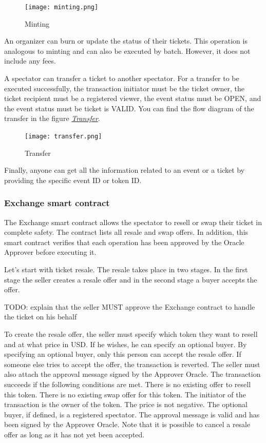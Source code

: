 \documentclass[a4paper,11pt,oneside]{report}
\begin{document}
\begin{figure}[h!]
  \texttt{[image: minting.png]}
  \caption{Minting}
  \label{fig:minting}
\end{figure}

An organizer can burn or update the status of their tickets. This operation is analogous to minting and can also be executed by batch. However, it does not include any fees.

A spectator can transfer a ticket to another spectator. For a transfer to be executed successfully, the transaction initiator must be the ticket owner, the ticket recipient must be a registered viewer, the event status must be OPEN, and the event status must be ticket is VALID. You can find the flow diagram of the transfer in the figure \hyperref[fig:transfer]{ \textit{Transfer}}.

\begin{figure}[h!]
  \centering
  \texttt{[image: transfer.png]}
  \caption{Transfer}
  \label{fig:transfer}
\end{figure}

Finally, anyone can get all the information related to an event or a ticket by providing the specific event ID or token ID.

\subsubsection{Exchange smart contract}
The Exchange smart contract allows the spectator to resell or swap their ticket in complete safety. The contract lists all resale and swap offers. In addition, this smart contract verifies that each operation has been approved by the Oracle Approver before executing it.

Let's start with ticket resale. The resale takes place in two stages. In the first stage the seller creates a resale offer and in the second stage a buyer accepts the offer.

TODO: explain that the seller MUST approve the Exchange contract to handle the ticket on his behalf

To create the resale offer, the seller must specify which token they want to resell and at what price in USD. If he wishes, he can specify an optional buyer. By specifying an optional buyer, only this person can accept the resale offer. If someone else tries to accept the offer, the transaction is reverted. The seller must also attach the approval message signed by the Approver Oracle. The transaction succeeds if the following conditions are met. There is no existing offer to resell this token. There is no existing swap offer for this token. The initiator of the transaction is the owner of the token. The price is not negative. The optional buyer, if defined, is a registered spectator. The approval message is valid and has been signed by the Approver Oracle. Note that it is possible to cancel a resale offer as long as it has not yet been accepted.
\end{document}
